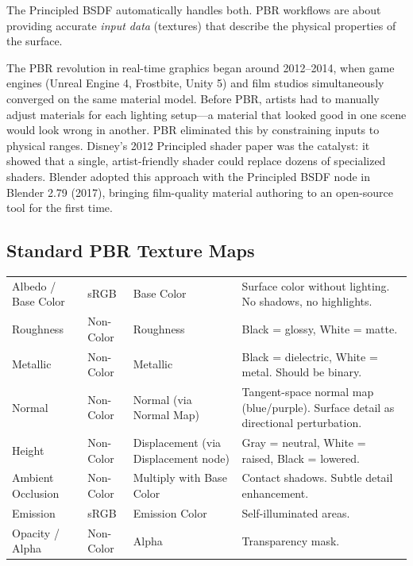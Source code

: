 The Principled BSDF automatically handles both. PBR workflows are
about providing accurate \emph{input data} (textures) that describe
the physical properties of the surface.

\begin{historynote}
The PBR revolution in real-time graphics began around 2012--2014,
when game engines (Unreal Engine 4, Frostbite, Unity 5) and film
studios simultaneously converged on the same material model. Before
PBR, artists had to manually adjust materials for each lighting
setup---a material that looked good in one scene would look wrong
in another. PBR eliminated this by constraining inputs to physical
ranges. Disney's 2012 Principled shader paper was the catalyst: it
showed that a single, artist-friendly shader could replace dozens
of specialized shaders. Blender adopted this approach with the
Principled BSDF node in Blender 2.79 (2017), bringing film-quality
material authoring to an open-source tool for the first time.
\end{historynote}

\subsection{Standard PBR Texture Maps}

\begin{center}
\begin{tabularx}{\textwidth}{L{2.8cm}C{1.8cm}L{3.2cm}X}
\toprule
{}
 &  &  &  \\
\midrule
Albedo / Base Color & sRGB & Base Color & Surface color without lighting. No shadows, no highlights. \\
Roughness & Non-Color & Roughness & Black = glossy, White = matte. \\
Metallic & Non-Color & Metallic & Black = dielectric, White = metal. Should be binary. \\
Normal & Non-Color & Normal (via Normal Map) & Tangent-space normal map (blue/purple). Surface detail as directional perturbation. \\
Height & Non-Color & Displacement (via Displacement node) & Gray = neutral, White = raised, Black = lowered. \\
Ambient Occlusion & Non-Color & Multiply with Base Color & Contact shadows. Subtle detail enhancement. \\
Emission & sRGB & Emission Color & Self-illuminated areas. \\
Opacity / Alpha & Non-Color & Alpha & Transparency mask. \\
\bottomrule
\end{tabularx}
\end{center}

